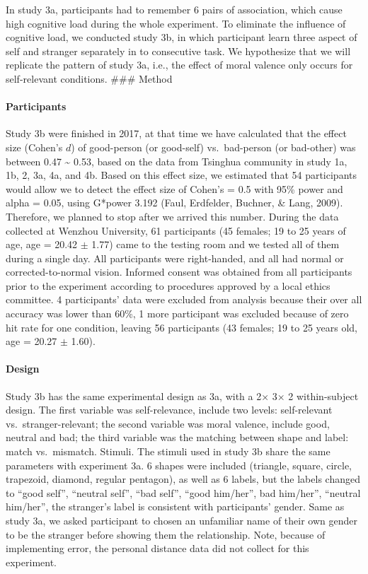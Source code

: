 \documentclass[
  english,
  man]{apa6}
\let\oldparagraph\paragraph
\renewcommand{\paragraph}[1]{\oldparagraph{#1}\mbox{}}
\begin{document}
In study 3a, participants had to remember 6 pairs of association, which cause high cognitive load during the whole experiment. To eliminate the influence of cognitive load, we conducted study 3b, in which participant learn three aspect of self and stranger separately in to consecutive task. We hypothesize that we will replicate the pattern of study 3a, i.e., the effect of moral valence only occurs for self-relevant conditions.
\#\#\# Method

\hypertarget{participants-6}{%
\paragraph{Participants}\label{participants-6}}

Study 3b were finished in 2017, at that time we have calculated that the effect size (Cohen's \(d\)) of good-person (or good-self) vs.~bad-person (or bad-other) was between 0.47 \textasciitilde{} 0.53, based on the data from Tsinghua community in study 1a, 1b, 2, 3a, 4a, and 4b. Based on this effect size, we estimated that 54 participants would allow we to detect the effect size of Cohen's = 0.5 with 95\% power and alpha = 0.05, using G*power 3.192 (Faul, Erdfelder, Buchner, \& Lang, 2009). Therefore, we planned to stop after we arrived this number. During the data collected at Wenzhou University, 61 participants (45 females; 19 to 25 years of age, age = 20.42 \(\pm\) 1.77) came to the testing room and we tested all of them during a single day. All participants were right-handed, and all had normal or corrected-to-normal vision. Informed consent was obtained from all participants prior to the experiment according to procedures approved by a local ethics committee. 4 participants' data were excluded from analysis because their over all accuracy was lower than 60\%, 1 more participant was excluded because of zero hit rate for one condition, leaving 56 participants (43 females; 19 to 25 years old, age = 20.27 \(\pm\) 1.60).

\hypertarget{design-1}{%
\paragraph{Design}\label{design-1}}

Study 3b has the same experimental design as 3a, with a 2× 3× 2 within-subject design. The first variable was self-relevance, include two levels: self-relevant vs.~stranger-relevant; the second variable was moral valence, include good, neutral and bad; the third variable was the matching between shape and label: match vs.~mismatch.
Stimuli. The stimuli used in study 3b share the same parameters with experiment 3a. 6 shapes were included (triangle, square, circle, trapezoid, diamond, regular pentagon), as well as 6 labels, but the labels changed to \enquote{good self}, \enquote{neutral self}, \enquote{bad self}, \enquote{good him/her}, bad him/her'', \enquote{neutral him/her}, the stranger's label is consistent with participants' gender. Same as study 3a, we asked participant to chosen an unfamiliar name of their own gender to be the stranger before showing them the relationship. Note, because of implementing error, the personal distance data did not collect for this experiment.
\end{document}
